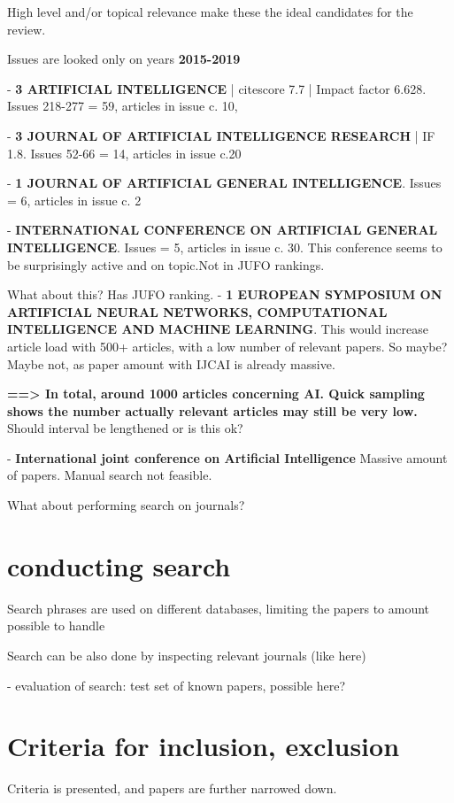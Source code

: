 \documentclass[utf8,english]{gradu3}
\begin{document}
High level and/or topical relevance make these the ideal candidates for the review.

Issues are looked only on years \textbf{2015-2019}

- \textbf{3 ARTIFICIAL INTELLIGENCE} | citescore 7.7 | Impact factor 6.628.
  Issues 218-277 = 59, articles in issue c. 10,

- \textbf{3 JOURNAL OF ARTIFICIAL INTELLIGENCE RESEARCH} | IF 1.8.
  Issues 52-66 = 14, articles in issue c.20

- \textbf{1 JOURNAL OF ARTIFICIAL GENERAL INTELLIGENCE}.
  Issues = 6, articles in issue c. 2

- \textbf{INTERNATIONAL CONFERENCE ON ARTIFICIAL GENERAL INTELLIGENCE}. Issues =
  5, articles in issue c. 30. This conference seems to be surprisingly active
  and on topic.Not in JUFO rankings.
  
  What about this? Has JUFO ranking. - \textbf{1 EUROPEAN SYMPOSIUM ON
ARTIFICIAL NEURAL NETWORKS, COMPUTATIONAL INTELLIGENCE AND MACHINE LEARNING}.
This would increase article load with 500+ articles, with a low number of
relevant papers. So maybe? Maybe not, as paper amount with IJCAI is already
massive.


  \textbf{==> In total, around 1000 articles concerning AI. Quick sampling shows
  the number actually relevant articles may still be very low.} Should interval
  be lengthened or is this ok?

- \textbf{International joint conference on Artificial Intelligence}
  Massive amount of papers. Manual search not feasible.

  What about performing search on journals? 


  

\section{conducting search}
Search phrases are used on different databases, limiting the papers to amount
possible to handle

Search can be also done by inspecting relevant journals (like here)

- evaluation of search: test set of known papers, possible here?

\section{Criteria for inclusion, exclusion}
Criteria is presented, and papers are further narrowed down.
\end{document}
